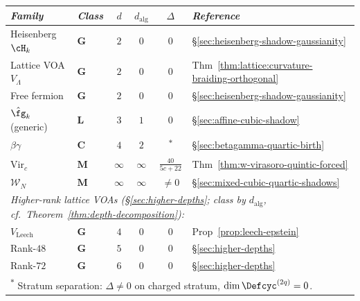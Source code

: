 \begin{example}
\label{ex:shadow-depth-all-families}
\begin{center}
\small
\renewcommand{\arraystretch}{1.15}
\begin{tabular}{llcccl}
\toprule
\emph{Family} &
\emph{Class} &
$d$ &
$d_{\mathrm{alg}}$ &
$\Delta$ &
\emph{Reference} \\
\midrule
Heisenberg $\cH_k$ &
  $\mathbf{G}$ & $2$ & $0$ & $0$ &
  \S\ref{sec:heisenberg-shadow-gaussianity} \\
Lattice VOA $V_\Lambda$ &
  $\mathbf{G}$ & $2$ & $0$ & $0$ &
  Thm~\ref{thm:lattice:curvature-braiding-orthogonal} \\
Free fermion &
  $\mathbf{G}$ & $2$ & $0$ & $0$ &
  \S\ref{sec:heisenberg-shadow-gaussianity} \\[3pt]
$\hat{\fg}_k$ (generic) &
  $\mathbf{L}$ & $3$ & $1$ & $0$ &
  \S\ref{sec:affine-cubic-shadow} \\[3pt]
$\beta\gamma$ &
  $\mathbf{C}$ & $4$ & $2$ & \textsuperscript{$\ast$} &
  \S\ref{sec:betagamma-quartic-birth} \\[3pt]
$\mathrm{Vir}_c$ &
  $\mathbf{M}$ & $\infty$ & $\infty$
  & $\frac{40}{5c{+}22}$ &
  Thm~\ref{thm:w-virasoro-quintic-forced} \\
$\mathcal{W}_N$ &
  $\mathbf{M}$ & $\infty$ & $\infty$
  & $\neq 0$ &
  \S\ref{sec:mixed-cubic-quartic-shadows} \\[6pt]
\multicolumn{6}{l}{\emph{Higher-rank lattice VOAs
  (\S\ref{sec:higher-depths}; class by $d_{\mathrm{alg}}$, cf.\
  Theorem~\ref{thm:depth-decomposition}):}} \\
$V_{\mathrm{Leech}}$ &
  $\mathbf{G}$ & $4$ & $0$ & $0$ &
  Prop~\ref{prop:leech-epstein} \\
Rank-$48$ &
  $\mathbf{G}$ & $5$ & $0$ & $0$ &
  \S\ref{sec:higher-depths} \\
Rank-$72$ &
  $\mathbf{G}$ & $6$ & $0$ & $0$ &
  \S\ref{sec:higher-depths} \\
\bottomrule
\multicolumn{6}{l}{\textsuperscript{$\ast$}%
  Stratum separation: $\Delta \neq 0$ on charged stratum,
  $\dim\Defcyc^{(2q)} = 0$.}
\end{tabular}
\end{center}
\end{example}

